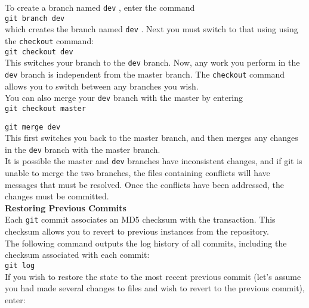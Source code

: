 \documentclass[11pt]{article}
\begin{document}
\noindent
To create a branch named {\tt dev} , enter the command \\

{\tt git branch dev} \\

\noindent 
which creates the branch named {\tt dev} . Next you must switch to that using using the {\tt checkout}
command: \\

{\tt git checkout dev} \\

\noindent
This switches your branch to the {\tt dev} branch. Now, any work you perform in the {\tt dev} branch is independent from the master branch. The {\tt checkout} command allows you to switch between any branches you wish. \\

\noindent
You can also merge your {\tt dev} branch with the master by entering \\

{\tt git checkout master} 

{\tt git merge dev} \\

\noindent
This first switches you back to the master branch, and then merges any changes in the {\tt dev} branch with the master branch. \\

\noindent
It is possible the master and {\tt dev} branches have inconsistent changes, and if git is unable to merge the two branches, the files containing conflicts will have messages that must be resolved. Once the conflicts have been addressed, the changes must be committed. \\

\noindent
{\bf Restoring Previous Commits}\\

\noindent
Each {\tt git} commit associates an {\small MD5} checksum with the transaction. This checksum allows you to revert to previous instances from the repository. \\

\noindent
The following command outputs the log history of all commits, including the checksum associated with each commit: \\

{\tt git log} \\


\noindent
If you wish to restore the state to the most recent previous commit (let's assume you had made several changes to files and wish to revert to the previous commit), enter: \\
\end{document}
